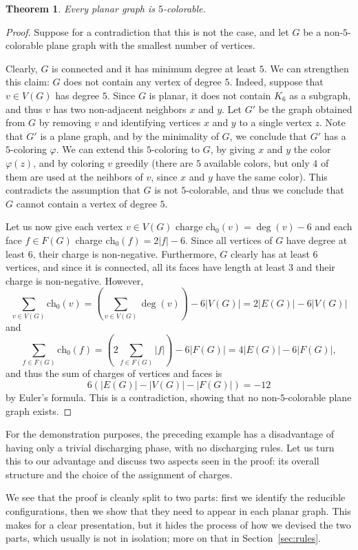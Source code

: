 \documentclass[12pt,twoside,openright,a4paper]{book}
\newtheorem{theorem}{Theorem}[chapter]
\newcommand{\initch}{\text{ch}_0}
\begin{document}
\begin{theorem}\label{thm:planar5col}
Every planar graph is $5$-colorable.
\end{theorem}
\begin{proof}
Suppose for a contradiction that this is not the case, and let $G$ be a non-$5$-colorable plane graph
with the smallest number of vertices.

Clearly, $G$ is connected and it has minimum degree at least $5$.  We can strengthen this claim: $G$ does not
contain any vertex of degree $5$.  Indeed, suppose that $v\in V(G)$ has degree $5$.  Since $G$ is planar, it does
not contain $K_6$ as a subgraph, and thus $v$ has two non-adjacent neighbors $x$ and $y$.  Let $G'$ be the graph obtained
from $G$ by removing $v$ and identifying vertices $x$ and $y$ to a single vertex $z$.  Note that $G'$ is a plane graph,
and by the minimality of $G$, we conclude that $G'$ has a $5$-coloring $\varphi$.  We can extend this $5$-coloring to $G$,
by giving $x$ and $y$ the color $\varphi(z)$, and by coloring $v$ greedily (there are $5$ available colors, but only
$4$ of them are used at the neihbors of $v$, since $x$ and $y$ have the same color).  This contradicts the assumption
that $G$ is not $5$-colorable, and thus we conclude that $G$ cannot contain a vertex of degree $5$.

Let us now give each vertex $v\in V(G)$ charge $\initch(v)=\deg(v)-6$ and each face $f\in F(G)$ charge $\initch(f)=2|f|-6$.
Since all vertices of $G$ have degree at least $6$, their charge is non-negative.  Furthermore, $G$ clearly has at least $6$
vertices, and since it is connected, all its faces have length at least $3$ and their charge is non-negative.
However,
$$\sum_{v\in V(G)} \initch(v)=\left(\sum_{v\in V(G)} \deg(v)\right)-6|V(G)|=2|E(G)|-6|V(G)|$$
and
$$\sum_{f\in F(G)} \initch(f)=\left(2\sum_{f\in F(G)} |f|\right)-6|F(G)|=4|E(G)|-6|F(G)|,$$
and thus the sum of charges of vertices and faces is
$$6(|E(G)|-|V(G)|-|F(G)|)=-12$$
by Euler's formula.  This is a contradiction, showing that no non-$5$-colorable plane graph exists.
\end{proof}

For the demonstration purposes, the preceding example has a disadvantage of
having only a trivial discharging phase, with no discharging rules.  Let us
turn this to our advantage and discuss two aspects seen in the proof: its
overall structure and the choice of the assignment of charges.

We see that the proof is cleanly split to two parts: first we identify the reducible configurations, then we show
that they need to appear in each planar graph.  This makes for a clear presentation, but it hides the process of
how we devised the two parts, which usually is not in isolation; more on that in Section~\ref{sec:rules}.
\end{document}
